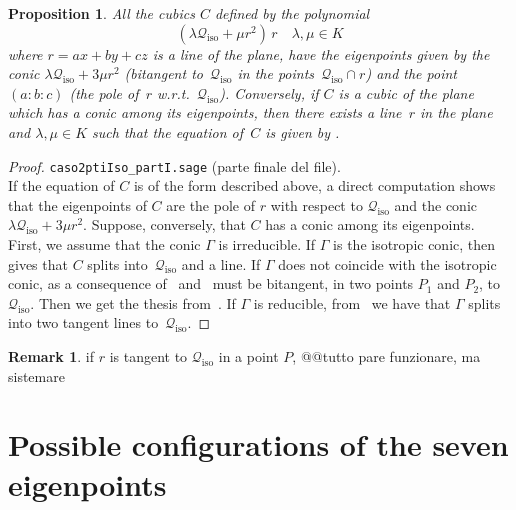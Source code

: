 \documentclass{amsart}
\theoremstyle{plain}
\newtheorem{prop}[lemma]{Proposition}
\theoremstyle{definition}
\newtheorem{rmk}[lemma]{Remark}
\newcommand{\iso}{\mathcal{Q}_{\mathrm{iso}}}
\begin{document}
\begin{prop}
All the cubics $C$ defined by the polynomial
%
\begin{equation}
\label{cub_conica_eig}
  (\lambda \iso + \mu r^2) \, r \quad \mbox{$\lambda, \mu \in K$}
\end{equation}
%
where $r=ax+by+cz$ is a line of the plane,
have the eigenpoints given by the conic
$\lambda \iso+3\mu r^2$ (bitangent to~$\iso$ in the points~$\iso \cap r$)
and the point~$(a:b:c)$ (the pole of~$r$
w.r.t.~$\iso$). Conversely, if
$C$ is a cubic of the plane which has a conic among its eigenpoints,
then there exists a line~$r$ in the plane and $\lambda, \mu \in K$
such that the equation of~$C$ is given by .
\end{prop}
\begin{proof}
\verb+caso2ptiIso_partI.sage+ (parte finale del file).\\
If the equation of $C$ is of the form described above, a direct computation
shows that the eigenpoints of $C$ are the pole of $r$ with respect to $\iso$
and the conic $\lambda \iso+3\mu r^2$. Suppose, conversely, that $C$ has
a conic among its eigenpoints. First, we assume that the conic $\Gamma$
is irreducible. If $\Gamma$ is the isotropic conic,
then~ gives that $C$ splits into~$\iso$ and a line.
If $\Gamma$ does not coincide with the
isotropic conic, as a consequence
of~ and~ must be bitangent,
in two points $P_1$ and $P_2$, to $\iso$. Then we get the thesis
from~. If $\Gamma$ is reducible,
from~ we have that $\Gamma$ splits
into two tangent lines to~$\iso$.
\end{proof}
\begin{rmk}
if $r$ is tangent to $\iso$ in a point $P$, @@tutto pare funzionare,
ma sistemare
\end{rmk}


\section{Possible configurations of the seven eigenpoints}
\label{further_alignments}
\end{document}
